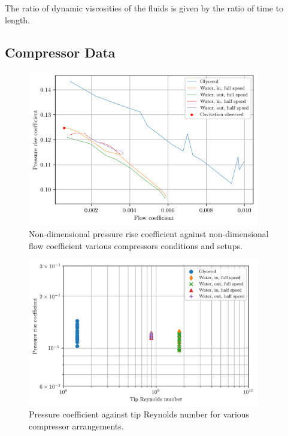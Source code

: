 \documentclass{article}
\begin{document}
The ratio of dynamic viscosities of the fluids is given by the ratio of time to length.

\subsection{Compressor Data}

\begin{figure}[H]
    \centering
    \includegraphics[width=0.9\textwidth]{compressor_non_dims.png}
    \caption{Non-dimensional pressure rise coefficient against non-dimensional flow coefficient various compressors conditions and setups.}
    \label{fig:compressor_non_dims}
\end{figure}

\begin{figure}[H]
    \centering
    \includegraphics[width=0.9\textwidth]{pressure_reynolds.png}
    \caption{Pressure coefficient against tip Reynolds number for various compressor arrangements.}
    \label{fig:compressor_pressure_re}
\end{figure}
\end{document}

